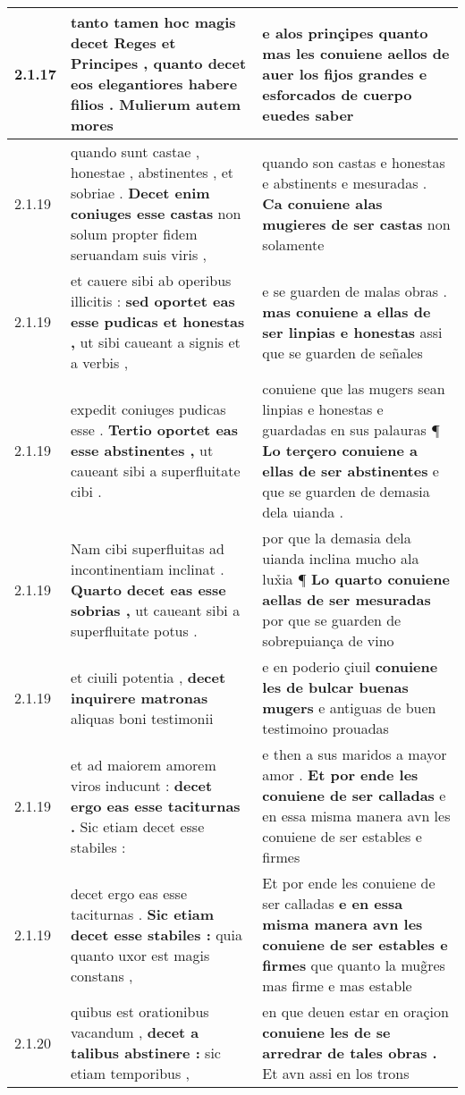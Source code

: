 \begin{tabular}{|p{1cm}|p{6.5cm}|p{6.5cm}|}
2.1.17 & tanto tamen hoc magis decet Reges et Principes , \textbf{ quanto decet eos elegantiores habere filios . } Mulierum autem mores & e alos prinçipes \textbf{ quanto mas les conuiene aellos de auer los fijos grandes e esforcados de cuerpo } euedes saber \\\hline
2.1.19 & quando sunt castae , honestae , abstinentes , et sobriae . \textbf{ Decet enim coniuges esse castas } non solum propter fidem seruandam suis viris , & quando son castas e honestas e abstinents e mesuradas . \textbf{ Ca conuiene alas mugieres de ser castas } non solamente \\\hline
2.1.19 & et cauere sibi ab operibus illicitis : \textbf{ sed oportet eas esse pudicas et honestas , } ut sibi caueant a signis et a verbis , & e se guarden de malas obras . \textbf{ mas conuiene a ellas de ser linpias e honestas } assi que se guarden de señales \\\hline
2.1.19 & expedit coniuges pudicas esse . \textbf{ Tertio oportet eas esse abstinentes , } ut caueant sibi a superfluitate cibi . & conuiene que las mugers sean linpias e honestas e guardadas en sus palauras ¶ \textbf{ Lo terçero conuiene a ellas de ser abstinentes } e que se guarden de demasia dela uianda . \\\hline
2.1.19 & Nam cibi superfluitas ad incontinentiam inclinat . \textbf{ Quarto decet eas esse sobrias , } ut caueant sibi a superfluitate potus . & por que la demasia dela uianda inclina mucho ala lux̉ia ¶ \textbf{ Lo quarto conuiene aellas de ser mesuradas } por que se guarden de sobrepuiança de vino \\\hline
2.1.19 & et ciuili potentia , \textbf{ decet inquirere matronas } aliquas boni testimonii & e en poderio çiuil \textbf{ conuiene les de bulcar buenas mugers } e antiguas de buen testimoino prouadas \\\hline
2.1.19 & et ad maiorem amorem viros inducunt : \textbf{ decet ergo eas esse taciturnas . } Sic etiam decet esse stabiles : & e then a sus maridos a mayor amor . \textbf{ Et por ende les conuiene de ser calladas } e en essa misma manera avn les conuiene de ser estables e firmes \\\hline
2.1.19 & decet ergo eas esse taciturnas . \textbf{ Sic etiam decet esse stabiles : } quia quanto uxor est magis constans , & Et por ende les conuiene de ser calladas \textbf{ e en essa misma manera avn les conuiene de ser estables e firmes } que quanto la mug̃res mas firme e mas estable \\\hline
2.1.20 & quibus est orationibus vacandum , \textbf{ decet a talibus abstinere : } sic etiam temporibus , & en que deuen estar en oraçion \textbf{ conuiene les de se arredrar de tales obras . } Et avn assi en los trons \\\hline

\end{tabular}
